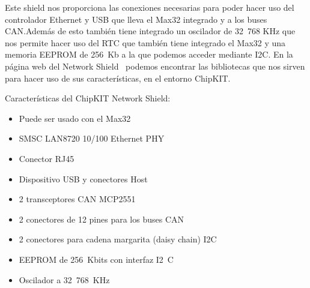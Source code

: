 
Este shield nos proporciona las conexiones necesarias para poder hacer uso del controlador Ethernet y USB que lleva el Max32 integrado y a los buses CAN.\@ Además de esto también tiene integrado un oscilador de 32~768 KHz que nos permite hacer uso del RTC que también tiene integrado el Max32 y una memoria EEPROM de 256~Kb a la que podemos acceder mediante I2C. En la página web del Network Shield~\cite{website:network_shield} podemos encontrar las bibliotecas que nos sirven para hacer uso de sus características, en el entorno ChipKIT.\@

Características del ChipKIT Network Shield:
\begin{itemize}
	\item Puede ser usado con el Max32
	\item SMSC LAN8720 10/100 Ethernet PHY
	\item Conector RJ45
	\item Dispositivo USB y conectores Host
	\item 2 transceptores CAN MCP2551
	\item 2 conectores de 12 pines para los buses CAN
	\item 2 conectores para cadena margarita (daisy chain) I2C
	\item EEPROM de 256~Kbits con interfaz I2~C
	\item Oscilador a 32~768~KHz
\end{itemize}



